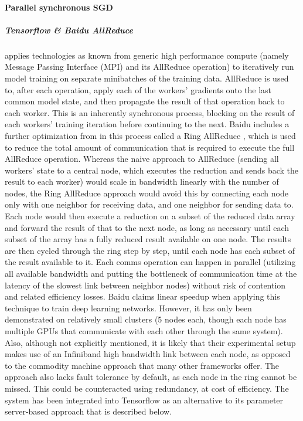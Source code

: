 \paragraph{Parallel synchronous SGD}


\subparagraph{Tensorflow \& Baidu AllReduce \citep{BaiduAllReduce2017}}

applies technologies as known from generic high performance compute (namely Message Passing Interface (MPI) and its AllReduce operation) to iteratively run model training on separate minibatches of the training data. AllReduce is used to, after each operation, apply each of the workers’ gradients onto the last common model state, and then propagate the result of that operation back to each worker. This is an inherently synchronous process, blocking on the result of each workers’ training iteration before continuing to the next.
Baidu includes a further optimization from \citet{Patarasuk2009} in this process called a Ring AllReduce , which is used to reduce the total amount of communication that is required to execute the full AllReduce operation. Whereas the naive approach to AllReduce (sending all workers’ state to a central node, which executes the reduction and sends back the result to each worker) would scale in bandwidth linearly with the number of nodes, the Ring AllReduce approach would avoid this by connecting each node only with one neighbor for receiving data, and one neighbor for sending data to. Each node would then execute a reduction on a subset of the reduced data array and forward the result of that to the next node, as long as necessary until each subset of the array has a fully reduced result available on one node. The results are then cycled through the ring step by step, until each node has each subset of the result available to it. Each comms operation can happen in parallel (utilizing all available bandwidth and putting the bottleneck of communication time at the latency of the slowest link between neighbor nodes) without risk of contention and related efficiency losses.
Baidu claims linear speedup when applying this technique to train deep learning networks. However, it has only been demonstrated on relatively small clusters (5 nodes each, though each node has multiple GPUs that communicate with each other through the same system). Also, although not explicitly mentioned, it is likely that their experimental setup makes use of an Infiniband high bandwidth link between each node, as opposed to the commodity machine approach that many other frameworks offer. The approach also lacks fault tolerance by default, as each node in the ring cannot be missed. This could be counteracted using redundancy, at cost of efficiency.
The system has been integrated into Tensorflow as an alternative to its parameter server-based approach that is described below.

